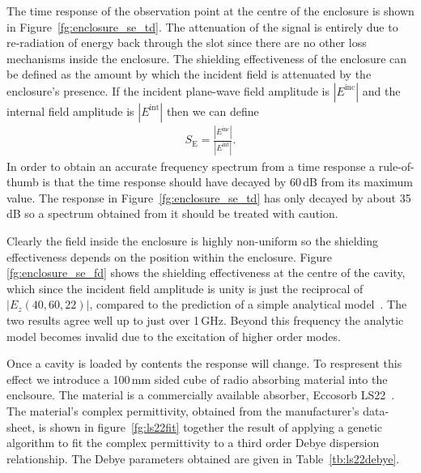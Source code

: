 \documentclass[onecolumn,a4paper]{article}
\numberwithin{equation}{section}
\begin{document}
The time response of the observation point at the centre of the enclosure is shown in 
Figure~\ref{fg:enclosure_se_td}. The attenuation of the signal is entirely due to re-radiation of energy
back through the slot since there are no other loss mechanisms inside the enclosure.
The shielding effectiveness of the enclosure can be defined as the amount by which the incident 
field is attenuated by the enclosure's presence. If the incident plane-wave field amplitude is $|E^\mathrm{inc}|$ and the internal
field amplitude is $|E^\mathrm{int}|$ then we can define
\begin{eqnarray}
S_\mathrm{E} = \frac{|E^\mathrm{inc}|}{|E^\mathrm{int}|}.
\end{eqnarray}
In order to obtain an accurate frequency spectrum from a time response a rule-of-thumb is that the time response
should have decayed by 60\,dB from its maximum value. The response in Figure~\ref{fg:enclosure_se_td} has only
decayed by about 35\,dB so a spectrum obtained from it should be treated with caution. 

Clearly the field inside the enclosure is highly non-uniform so the shielding effectiveness depends
on the position within the enclosure.  Figure \ref{fg:enclosure_se_fd} shows the shielding effectiveness
at the centre of the cavity, which since the incident field amplitude is unity is just the reciprocal of $|E_z(40,60,22)|$, 
compared to the prediction of a simple analytical model~\cite{Robinson1996}. The two results agree well up 
to just over 1\,GHz. Beyond this frequency the analytic model becomes invalid due to the excitation of higher order modes.

Once a cavity is loaded by contents the response will change. To respresent this effect we introduce a 100\,mm
sided cube of radio absorbing material into the enclsoure. The material is a commercially available absorber, 
Eccosorb LS22~\cite{eccosorb}. The material's complex permittivity, obtained from the manufacturer's data-sheet, is shown in figure~\ref{fg:ls22fit}
together the result of applying a genetic algorithm to fit the complex permittivity to a third order Debye dispersion
relationship. The Debye parameters obtained are given in Table~\ref{tb:ls22debye}.
\end{document}
